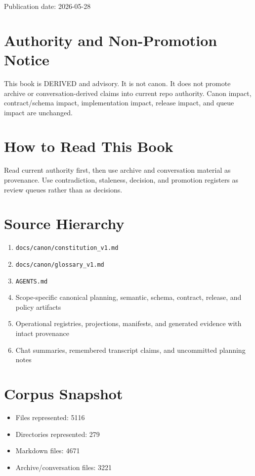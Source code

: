 \documentclass[10.5pt,a4paper]{book}
\begin{document}
Publication date: 2026-\allowbreak{}05-\allowbreak{}28


\chapter{Authority and Non-\allowbreak{}Promotion Notice}

This book is DERIVED and advisory.\allowbreak{} It is not canon.\allowbreak{} It does not promote archive or conversation-\allowbreak{}derived claims into current repo authority.\allowbreak{} Canon impact, contract/\allowbreak{}schema impact, implementation impact, release impact, and queue impact are unchanged.\allowbreak{}


\chapter{How to Read This Book}

Read current authority first, then use archive and conversation material as provenance.\allowbreak{} Use contradiction, staleness, decision, and promotion registers as review queues rather than as decisions.\allowbreak{}


\chapter{Source Hierarchy}

\begin{enumerate}
\item \texttt{docs/\allowbreak{}canon/\allowbreak{}constitution\_\allowbreak{}v1.\allowbreak{}md}
\item \texttt{docs/\allowbreak{}canon/\allowbreak{}glossary\_\allowbreak{}v1.\allowbreak{}md}
\item \texttt{AGENTS.\allowbreak{}md}
\item Scope-\allowbreak{}specific canonical planning, semantic, schema, contract, release, and policy artifacts
\item Operational registries, projections, manifests, and generated evidence with intact provenance
\item Chat summaries, remembered transcript claims, and uncommitted planning notes
\end{enumerate}

\chapter{Corpus Snapshot}

\begin{itemize}
\item Files represented: 5116
\item Directories represented: 279
\item Markdown files: 4671
\item Archive/\allowbreak{}conversation files: 3221
\end{itemize}
\end{document}
